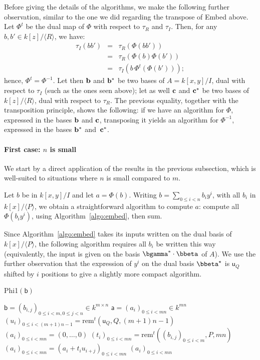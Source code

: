 \documentclass{sig-alternate}
\def\va {\ensuremath{\mathsf{a}}}
\def\vu {\ensuremath{\mathsf{u}}}
\def\vb {\ensuremath{\mathsf{b}}}
\def\rem {\ensuremath{\mathrm{rem}}}
\newcommand{\ang}[1]{\langle#1\rangle}
\begin{document}
Before giving the details of the algorithms, we make the following
further observation, similar to the one we did regarding the transpose
of Embed above. Let $\Phi^t$ be the dual map of $\Phi$ with respect to
$\tau_R$ and $\tau_I$. Then, for any $b,b' \in k[z]/\ang{R}$, we have:
\begin{eqnarray*}
\tau_I(b b') &=&  \tau_R(\Phi(b b'))\\
&=& \tau_R( \Phi(b) \Phi(b')) \\
&=& \tau_I(b\, \Phi^t(\Phi(b')));
\end{eqnarray*}
hence, $\Phi^t = \Phi^{-1}$. Let then ${\bf b}$ and ${\bf b}^\ast$ be
two bases of $A=k[x,y]/I$, dual with respect to $\tau_I$ (such as the
ones seen above); let as well ${\bf c}$ and ${\bf c}^\ast$ be two
bases of $k[z]/\ang{R}$, dual with respect to $\tau_R$. The previous
equality, together with the transposition principle, shows the
following: if we have an algorithm for $\Phi$, expressed in the bases
${\bf b}$ and ${\bf c}$, transposing it yields an algorithm for
$\Phi^{-1}$, expressed in the bases ${\bf b}^\ast$ and~${\bf c}^\ast$.

\paragraph*{{\bf \rm First case: $n$ is small}}
We start by a direct application of the results in the previous
subsection, which is well-suited to situations where $n$ is small
compared to $m$.

Let $b$ be in $k[x,y]/I$ and let $a=\Phi(b)$. Writing $b=\sum_{0 \le i
  < n} b_i y^i$, with all $b_i$ in $k[x]/\ang{P}$, we obtain a
straightforward algorithm to compute $a$: compute all $\Phi(b_iy^i)$,
using Algorithm~\ref{algo:embed}, then sum.

Since Algorithm~\ref{algo:embed} takes its inputs written on the dual
basis of $k[x]/\ang{P}$, the following algorithm requires all $b_i$ be
written this way (equivalently, the input is given on the basis
$\bgamma^\ast \cdot \bbeta$ of $A$). We use the further observation
that the expression of $y^i$ on the dual basis $\bbeta^\star$ is
$\vu_Q$ shifted by $i$ positions to give a slightly more compact
algorithm.

\begin{algorithm}[H]
  \caption{Phi1$(\vb)$}
  \begin{algorithmic}[1]
    \REQUIRE $\vb = (b_{i,j})_{0 \le i < m, 0 \le j < n} \in k^{m \times n}$
    \ENSURE $\va = (a_{i})_{0 \le i < mn} \in k^{m n}$
    \STATE $(u_i)_{0\le i < (m+1)n-1} = \rem^t(\vu_Q,Q,(m+1)n-1)$
    \STATE $(a_i)_{0\le i < mn} = (0,\dots,0)$
    \STATE $(t_i)_{0\le i < mn} = \rem^t( (b_{i,j})_{0 \le i <m}  ,P,mn)$
    \STATE $(a_i)_{0\le i < mn} = (a_i + t_iu_{i+j})_{0\le i < mn}$
    \ENDFOR
    \RETURN $(a_i)_{0\le i <mn}$
  \end{algorithmic}
  \label{algo:iso1}
\end{algorithm}
\end{document}

